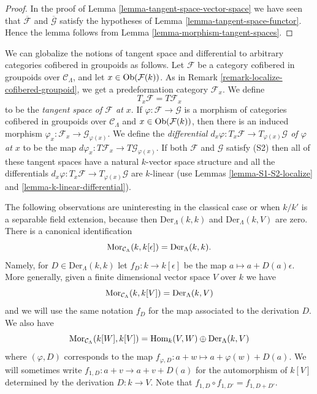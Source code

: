 \begin{proof}
In the proof of
Lemma \ref{lemma-tangent-space-vector-space}
we have seen that $\overline{\mathcal{F}}$ and $\overline{\mathcal{G}}$
satisfy the hypotheses of
Lemma \ref{lemma-tangent-space-functor}.
Hence the lemma follows from
Lemma \ref{lemma-morphism-tangent-spaces}.
\end{proof}

\begin{remark}
\label{remark-tangent-space-cofibered-groupoid}
We can globalize the notions of tangent space and differential to arbitrary
categories cofibered in groupoids as follows. Let $\mathcal{F}$ be a category
cofibered in groupoids over $\mathcal{C}_\Lambda$, and let
$x \in \mathop{\mathrm{Ob}}\nolimits(\mathcal{F}(k))$. As in
Remark \ref{remark-localize-cofibered-groupoid},
we get a predeformation category $\mathcal{F}_x$. We define
$$
T_x\mathcal{F} = T\mathcal{F}_x
$$
to be the {\it tangent space of $\mathcal{F}$ at $x$}. If
$\varphi : \mathcal{F} \to \mathcal{G}$ is a morphism of categories cofibered
in groupoids over $\mathcal{C}_\Lambda$ and $x \in \mathop{\mathrm{Ob}}\nolimits(\mathcal{F}(k))$,
then there is an induced morphism
$\varphi_x: \mathcal{F}_x \to \mathcal{G}_{\varphi(x)}$. We define the
{\it differential
$d_x \varphi : T_x \mathcal{F} \to T_{\varphi(x)} \mathcal{G}$
of $\varphi$ at $x$} to be the map
$d \varphi_x: T \mathcal{F}_x \to T \mathcal{G}_{\varphi(x)}$.
If both $\mathcal{F}$ and $\mathcal{G}$ satisfy (S2) then
all of these tangent spaces have a natural $k$-vector space structure
and all the differentials
$d_x \varphi : T_x \mathcal{F} \to T_{\varphi(x)} \mathcal{G}$
are $k$-linear (use
Lemmas \ref{lemma-S1-S2-localize} and \ref{lemma-k-linear-differential}).
\end{remark}

\noindent
The following observations are uninteresting in the classical case or when
$k/k'$ is a separable field extension, because then
$\text{Der}_\Lambda(k, k)$ and $\text{Der}_\Lambda(k, V)$ are zero.
There is a canonical identification
$$
\mathop{\mathrm{Mor}}\nolimits_{\mathcal{C}_\Lambda}(k, k[\epsilon]) =
\text{Der}_\Lambda(k, k).
$$
Namely, for $D \in \text{Der}_\Lambda(k, k)$ let $f_D : k \to k[\epsilon]$
be the map $a \mapsto a + D(a)\epsilon$. More generally, given a finite
dimensional vector space $V$ over $k$ we have
$$
\mathop{\mathrm{Mor}}\nolimits_{\mathcal{C}_\Lambda}(k, k[V]) =
\text{Der}_\Lambda(k, V)
$$
and we will use the same notation $f_D$ for the map associated to the
derivation $D$. We also have
$$
\mathop{\mathrm{Mor}}\nolimits_{\mathcal{C}_\Lambda}(k[W], k[V]) =
\mathop{\mathrm{Hom}}\nolimits_k(V, W) \oplus \text{Der}_\Lambda(k, V)
$$
where $(\varphi, D)$ corresponds to the map
$f_{\varphi, D} : a + w \mapsto a + \varphi(w) + D(a)$. We will sometimes write
$f_{1, D} : a + v \to a + v + D(a)$ for the automorphism
of $k[V]$ determined by the derivation $D : k \to V$. Note that
$f_{1, D} \circ f_{1, D'} = f_{1, D + D'}$.

